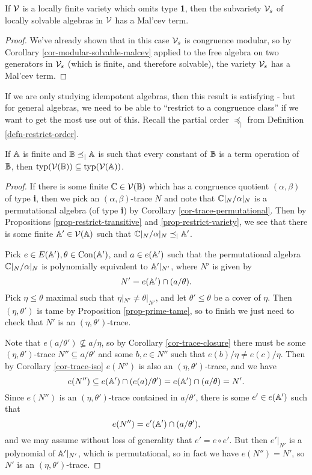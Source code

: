 \begin{appendices}
\begin{cor} If $\mathcal{V}$ is a locally finite variety which omits type \textbf{1}, then the subvariety $\mathcal{V}_s$ of locally solvable algebras in $\mathcal{V}$ has a Mal'cev term.
\end{cor}
\begin{proof} We've already shown that in this case $\mathcal{V}_s$ is congruence modular, so by Corollary \ref{cor-modular-solvable-malcev} applied to the free algebra on two generators in $\mathcal{V}_s$ (which is finite, and therefore solvable), the variety $\mathcal{V}_s$ has a Mal'cev term.
\end{proof}

If we are only studying idempotent algebras, then this result is satisfying - but for general algebras, we need to be able to ``restrict to a congruence class'' if we want to get the most use out of this. Recall the partial order $\preceq_|$ from Definition \ref{defn-restrict-order}.

\begin{prop} If $\mathbb{A}$ is finite and $\mathbb{B} \preceq_| \mathbb{A}$ is such that every constant of $\mathbb{B}$ is a term operation of $\mathbb{B}$, then $\operatorname{typ}(\mathcal{V}(\mathbb{B})) \subseteq \operatorname{typ}(\mathcal{V}(\mathbb{A}))$.
\end{prop}
\begin{proof} If there is some finite $\mathbb{C} \in \mathcal{V}(\mathbb{B})$ which has a congruence quotient $(\alpha, \beta)$ of type \textbf{i}, then we pick an $(\alpha,\beta)$-trace $N$ and note that $\mathbb{C}|_N / \alpha|_N$ is a permutational algebra (of type \textbf{i}) by Corollary \ref{cor-trace-permutational}. Then by Propositions \ref{prop-restrict-transitive} and \ref{prop-restrict-variety}, we see that there is some finite $\mathbb{A}' \in \mathcal{V}(\mathbb{A})$ such that $\mathbb{C}|_N/\alpha|_N \preceq_| \mathbb{A}'$.

Pick $e \in E(\mathbb{A}'), \theta \in \operatorname{Con}(\mathbb{A}')$, and $a \in e(\mathbb{A}')$ such that the permutational algebra $\mathbb{C}|_N/\alpha|_N$ is polynomially equivalent to $\mathbb{A}'|_{N'}$, where $N'$ is given by
\[
N' = e(\mathbb{A}') \cap (a / \theta).
\]
Pick $\eta \le \theta$ maximal such that $\eta|_{N'} \ne \theta|_{N'}$, and let $\theta' \le \theta$ be a cover of $\eta$. Then $(\eta, \theta')$ is tame by Proposition \ref{prop-prime-tame}, so to finish we just need to check that $N'$ is an $(\eta,\theta')$-trace.

Note that $e(a/\theta') \not\subseteq a/\eta$, so by Corollary \ref{cor-trace-closure} there must be some $(\eta,\theta')$-trace $N'' \subseteq a/\theta'$ and some $b,c \in N''$ such that $e(b)/\eta \ne e(c)/\eta$. Then by Corollary \ref{cor-trace-iso} $e(N'')$ is also an $(\eta,\theta')$-trace, and we have
\[
e(N'') \subseteq e(\mathbb{A}') \cap (e(a)/\theta') = e(\mathbb{A}') \cap (a/\theta) = N'.
\]
Since $e(N'')$ is an $(\eta,\theta')$-trace contained in $a/\theta'$, there is some $e' \in e(\mathbb{A}')$ such that
\[
e(N'') = e'(\mathbb{A}') \cap (a/\theta'),
\]
and we may assume without loss of generality that $e' = e \circ e'$. But then $e'|_{N'}$ is a polynomial of $\mathbb{A}'|_{N'}$, which is permutational, so in fact we have $e(N'') = N'$, so $N'$ is an $(\eta,\theta')$-trace.
\end{proof}


\end{appendices}
